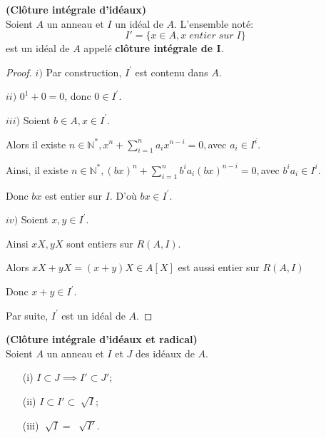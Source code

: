 \begin{moncorollaire}\textbf{(Clôture intégrale d'idéaux)}\cite{Di2}\\
	Soient $A$ un anneau et $I$ un idéal de $A$.
	L'ensemble noté: 
	\[ I'=\{x \in A, x \; entier \; sur \; I \} \]
	est un idéal de $A$ appelé \textbf{clôture intégrale de I}.
\end{moncorollaire}
\begin{proof}
	
	$i)$ Par construction, $I^{\prime }$ est contenu dans $ A.$
	
	$ii)$ $0^{1}+0=0$, donc $0\in I^{\prime }.$
	
	$iii)$ Soient $b\in A,x\in I^{\prime }.$
	
	Alors il existe $n\in \mathbb{N}^{\ast },x^{n}+\sum\limits_{i=1}^{n}a_{i}x^{n-i}=0,$avec $a_{i}\in I^{i}.$
	
	Ainsi, il existe $n\in \mathbb{N}^{\ast },(bx)^{n}+\sum\limits_{i=1}^{n}b^{i}a_{i}(bx)^{n-i}=0,$avec $
	b^{i}a_{i}\in I^{i}.$
	
	Donc $bx$ est entier sur $I.$ D'où $bx\in I^{\prime }.$
	
	$iv)$ Soient $x,y\in I^{\prime }.$
	
	Ainsi $xX,yX$ sont entiers sur $R(A,I).$
	
	Alors $xX+yX=(x+y)X\in A[X]$ est aussi entier sur $R(A,I)$
	
	Donc $x+y\in I^{\prime }.$
	
	Par suite, $I^{\prime }$ est un idéal de $A.$
\end{proof}
\begin{maremarque}\textbf{(Clôture intégrale d'idéaux et radical)}\cite{Di2} \\
	Soient $A$ un anneau et $I$ et $J$ des idéaux de $A$.
	\begin{enumerate}
		\item[(i)]$I \subset J \implies I' \subset J' $;
		\item[(ii)]$I \subset I' \subset \sqrt[]{I} $;
		\item[(iii)]$\sqrt[]{I} = \; \sqrt[]{I'} $.
	\end{enumerate}
\end{maremarque}
